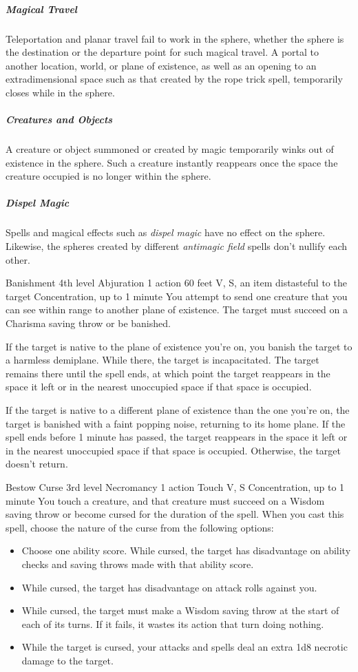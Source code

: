 \documentclass[10pt,a4paper,twoside,bg=print,twocolumn,openany,nodeprecatedcode]{dndbook}
\begin{document}
\subparagraph{Magical Travel}
Teleportation and planar travel fail to work in the sphere, whether the sphere is the destination or the departure point for such magical travel. A portal to another location, world, or plane of existence, as well as an opening to an extradimensional space such as that created by the rope trick spell, temporarily closes while in the sphere.

\subparagraph{Creatures and Objects}
A creature or object summoned or created by magic temporarily winks out of existence in the sphere. Such a creature instantly reappears once the space the creature occupied is no longer within the sphere.

\subparagraph{Dispel Magic}
Spells and magical effects such as \textit{dispel magic} have no effect on the sphere. Likewise, the spheres created by different \textit{antimagic field} spells don't nullify each other.



\DndSpellHeader%
{Banishment}
{4th level Abjuration}
{1 action}
{60 feet}
{V, S, an item distasteful to the target}
{Concentration, up to 1 minute}
You attempt to send one creature that you can see within range to another plane of existence. The target must succeed on a Charisma saving throw or be banished.

If the target is native to the plane of existence you're on, you banish the target to a harmless demiplane. While there, the target is incapacitated. The target remains there until the spell ends, at which point the target reappears in the space it left or in the nearest unoccupied space if that space is occupied.

If the target is native to a different plane of existence than the one you're on, the target is banished with a faint popping noise, returning to its home plane. If the spell ends before 1 minute has passed, the target reappears in the space it left or in the nearest unoccupied space if that space is occupied. Otherwise, the target doesn't return.



\DndSpellHeader%
{Bestow Curse}
{3rd level Necromancy}
{1 action}
{Touch}
{V, S}
{Concentration, up to 1 minute}
You touch a creature, and that creature must succeed on a Wisdom saving throw or become cursed for the duration of the spell. When you cast this spell, choose the nature of the curse from the following options:


\begin{itemize}
\item Choose one ability score. While cursed, the target has disadvantage on ability checks and saving throws made with that ability score.
\item While cursed, the target has disadvantage on attack rolls against you.
\item While cursed, the target must make a Wisdom saving throw at the start of each of its turns. If it fails, it wastes its action that turn doing nothing.
\item While the target is cursed, your attacks and spells deal an extra 1d8 necrotic damage to the target.
\end{itemize}
\end{document}
